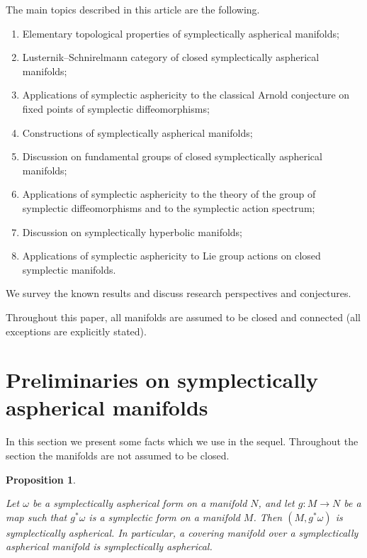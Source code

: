 \documentclass[12pt]{amsart}
\newtheorem{prop}[subsection]{Proposition}
\numberwithin{equation}{section}
\theoremstyle{definition}
\theoremstyle{remark}
\numberwithin{figure}{section}
\numberwithin{table}{section}
\begin{document}
The main topics described in this article are the 
following. 
\begin{enumerate} 
\item Elementary topological properties of symplectically aspherical manifolds; 
\item Lusternik--Schnirelmann category of closed symplectically aspherical 
manifolds; 
\item Applications of symplectic asphericity to the classical Arnold conjecture  
on  
fixed points of symplectic diffeomorphisms; 
\item Constructions of symplectically aspherical manifolds; 
\item Discussion on fundamental groups of closed symplectically aspherical  
manifolds; 
\item Applications of symplectic asphericity to the theory of the group of  
symplectic  
diffeomorphisms and to the symplectic action spectrum; 
\item Discussion on symplectically hyperbolic manifolds; 
\item Applications of symplectic asphericity to Lie group actions on closed  
symplectic  
manifolds. 
\end{enumerate} 
 
We survey the known results and discuss research perspectives and conjectures.   
     
Throughout this paper, all manifolds are assumed to be closed and connected  
(all exceptions are explicitly stated). 
 
 
 
\section{Preliminaries on symplectically aspherical manifolds}\label{S: prelim} 
 
In this section we present some facts which we use in the sequel.   
Throughout  
the section the manifolds are not assumed to be closed. 
 
 
 
\begin{prop} 
\label{induced} 
 
Let $\omega$ be a symplectically aspherical form on a manifold $N$, and let  
$g: M \to N$ be a map such that $g^*\omega$ is a symplectic form on a manifold  
$M$. Then $(M, g^*\omega)$ is symplectically aspherical. In particular, a 
covering manifold  
over a symplectically aspherical manifold is symplectically aspherical. 
\end{prop} 
 
\end{document}
